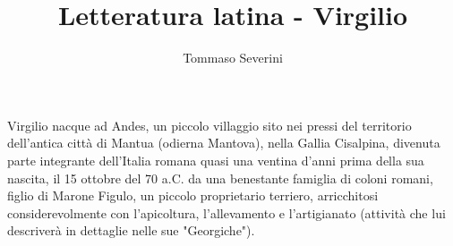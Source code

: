 \documentclass[10pt,a4paper]{article}
\author{Tommaso Severini}
\title{Letteratura latina - Virgilio}
\begin{document}
	\maketitle
	
	Virgilio nacque ad Andes, un piccolo villaggio sito nei pressi del territorio dell'antica città di Mantua (odierna Mantova), nella Gallia Cisalpina, divenuta parte integrante dell'Italia romana quasi una ventina d'anni prima della sua nascita, il 15 ottobre del 70 a.C. da una benestante famiglia di coloni romani, figlio di Marone Figulo, un piccolo proprietario terriero, arricchitosi considerevolmente con l'apicoltura, l'allevamento e l'artigianato (attività che lui descriverà in dettaglie nelle sue "Georgiche").
	
\end{document}
